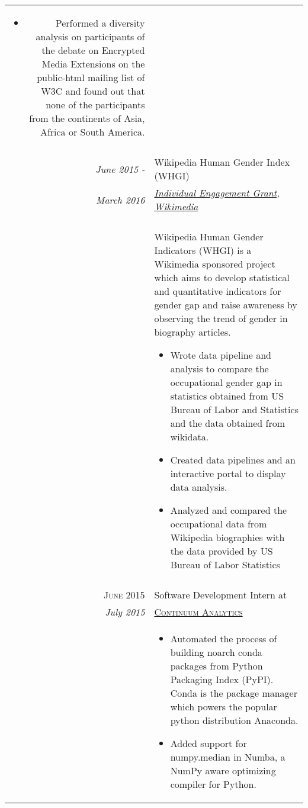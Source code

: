 \documentclass[a4paper,10pt]{article}
\begin{document}
\begin{samepage}
\begin{tabular}{r|p{12cm}}
\begin{itemize}
            \item Performed a diversity analysis on participants of the debate
                on Encrypted Media Extensions on the public-html mailing list
                of W3C and found out that none of the participants from the
                continents of Asia, Africa or South America.
        \end{itemize}

    \\\multicolumn{2}{c}{} \\

    \emph{June 2015 - } & Wikipedia Human Gender Index (WHGI) \\\emph{March 2016}&
    \emph{\href{https://meta.wikimedia.org/wiki/Grants:IEG/WIGI:_Wikipedia_Gender_Index}{Individual
    Engagement Grant, Wikimedia}}\\& \\&
            Wikipedia Human Gender Indicators (WHGI)
            is a Wikimedia sponsored project which aims to
            develop statistical and quantitative indicators for gender gap
            and raise awareness by observing the trend of gender in biography
            articles.
        \begin{itemize}
            \item Wrote data pipeline and analysis to compare the occupational
                gender gap in statistics obtained from US Bureau of Labor and
                Statistics and the data obtained from wikidata.
            \item Created data pipelines and an interactive portal to display data analysis.
            \item Analyzed and compared the occupational data from Wikipedia
                biographies with the data provided by US Bureau of Labor Statistics
        \end{itemize}

\\\multicolumn{2}{c}{} \\


\textsc{June 2015} & Software Development Intern at  \\\emph{July 2015} &
\textsc{\href{http://continuum.io/}{Continuum Analytics}}
    \emph{}\\&
    \begin{itemize}
        \item Automated the process of building noarch conda packages from Python
    Packaging Index (PyPI). Conda is the package manager which powers the
    popular python distribution Anaconda.
        \item Added support for numpy.median in Numba, a NumPy aware optimizing compiler
    for Python.
    \end{itemize}


\end{tabular}
\end{samepage}
\end{document}
